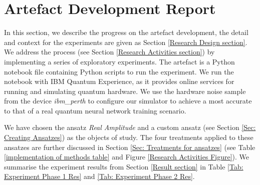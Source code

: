 \section{Artefact Development Report}\label{Minimum Artefact section}

In this section, we describe the progress on the artefact development, the detail and context for the experiments are given as Section \ref{Research Design section}.
We address the process (see Section \ref{Research Activities section}) by implementing a series of exploratory experiments.
The artefact is a Python notebook file containing Python scripts to run the experiment.
We run the notebook with IBM Quantum Experience, as it provides online services for running and simulating quantum hardware.
We use the hardware noise sample from the device \emph{ibm\_perth} to configure our simulator to achieve a most accurate to that of a real quantum neural network training scenario.

We have chosen the ansatz \emph{Real Amplitude} and a custom ansatz (see Section \ref{Sec: Creating Ansatzes}) as the objects of study.
The four treatments applied to these ansatzes are further discussed in Section \ref{Sec: Treatments for ansatzes} (see Table \ref{implementation of methods table} and Figure \ref{Research Activities Figure}).
We summarise the experiment results from Section \ref{Result section} in Table \ref{Tab: Experiment Phase 1 Res} and \ref{Tab: Experiment Phase 2 Res}.
















